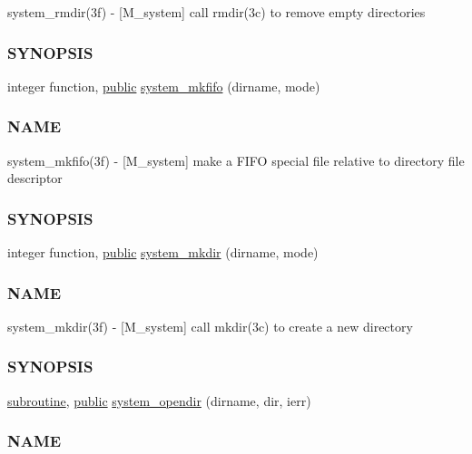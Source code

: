 \begin{DoxyCompactItemize}
\begin{DoxyCompactList}
system\+\_\+rmdir(3f) -\/ \mbox{[}M\+\_\+system\mbox{]} call rmdir(3c) to remove empty directories \subsubsection*{S\+Y\+N\+O\+P\+S\+IS}\end{DoxyCompactList}\item 
integer function, \hyperlink{M__stopwatch_83_8txt_a2f74811300c361e53b430611a7d1769f}{public} \hyperlink{namespacem__system_aaa02751b5065c8fd046a56cbbd1a0e1e}{system\+\_\+mkfifo} (dirname, mode)
\begin{DoxyCompactList}\small\item\em \subsubsection*{N\+A\+ME}

system\+\_\+mkfifo(3f) -\/ \mbox{[}M\+\_\+system\mbox{]} make a F\+I\+FO special file relative to directory file descriptor \subsubsection*{S\+Y\+N\+O\+P\+S\+IS}\end{DoxyCompactList}\item 
integer function, \hyperlink{M__stopwatch_83_8txt_a2f74811300c361e53b430611a7d1769f}{public} \hyperlink{namespacem__system_a084d644c236d22af2cc75c6e48fd6e96}{system\+\_\+mkdir} (dirname, mode)
\begin{DoxyCompactList}\small\item\em \subsubsection*{N\+A\+ME}

system\+\_\+mkdir(3f) -\/ \mbox{[}M\+\_\+system\mbox{]} call mkdir(3c) to create a new directory \subsubsection*{S\+Y\+N\+O\+P\+S\+IS}\end{DoxyCompactList}\item 
\hyperlink{M__stopwatch_83_8txt_acfbcff50169d691ff02d4a123ed70482}{subroutine}, \hyperlink{M__stopwatch_83_8txt_a2f74811300c361e53b430611a7d1769f}{public} \hyperlink{namespacem__system_a622cc67c03e8cdea1d4c2430bb36081b}{system\+\_\+opendir} (dirname, dir, ierr)
\begin{DoxyCompactList}\small\item\em \subsubsection*{N\+A\+ME}


\end{DoxyCompactList}
\end{DoxyCompactItemize}
